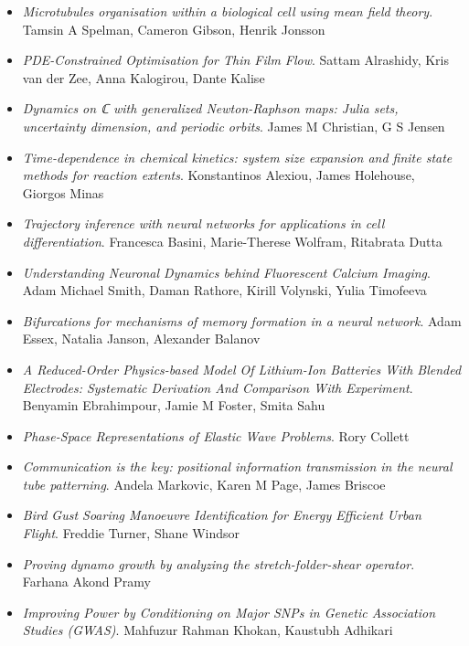 \begin{itemize}
\item \textit{Microtubules organisation within a biological cell using mean field theory}.
Tamsin A Spelman, Cameron Gibson, Henrik Jonsson

\item \textit{PDE-Constrained Optimisation for Thin Film Flow}.
Sattam Alrashidy, Kris van der Zee, Anna Kalogirou, Dante Kalise

\item \textit{Dynamics on ℂ with generalized Newton-Raphson maps: Julia sets, uncertainty dimension, and periodic orbits}.
James M Christian, G S Jensen

\item \textit{Time-dependence in chemical kinetics: system size expansion and finite state methods for reaction extents}.
Konstantinos Alexiou, James Holehouse, Giorgos Minas

\item \textit{Trajectory inference with neural networks for applications in cell differentiation}.
Francesca Basini, Marie-Therese Wolfram, Ritabrata Dutta

\item \textit{Understanding Neuronal Dynamics behind Fluorescent Calcium Imaging}.
Adam Michael Smith, Daman Rathore, Kirill Volynski, Yulia Timofeeva

\item \textit{Bifurcations for mechanisms of memory formation in a neural network}.
Adam Essex, Natalia Janson, Alexander Balanov

\item \textit{A Reduced-Order Physics-based Model Of Lithium-Ion Batteries With Blended Electrodes: Systematic Derivation And Comparison With Experiment}.
Benyamin Ebrahimpour, Jamie M Foster, Smita Sahu

\item \textit{Phase-Space Representations of Elastic Wave Problems}.
Rory Collett

\item \textit{Communication is the key: positional information transmission in the neural tube patterning}.
Andela Markovic, Karen M Page, James Briscoe

\item \textit{Bird Gust Soaring Manoeuvre Identification for Energy Efficient Urban Flight}.
Freddie Turner, Shane Windsor

\item \textit{Proving dynamo growth by analyzing the stretch-folder-shear operator}.
Farhana Akond Pramy

\item \textit{Improving Power by Conditioning on Major SNPs in Genetic Association Studies (GWAS)}.
Mahfuzur Rahman Khokan, Kaustubh Adhikari

\end{itemize}

